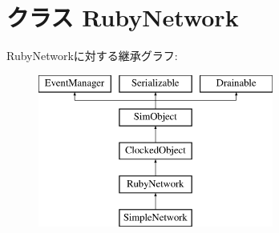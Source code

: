 \hypertarget{classNetwork_1_1RubyNetwork}{
\section{クラス RubyNetwork}
\label{classNetwork_1_1RubyNetwork}
}
RubyNetworkに対する継承グラフ:\begin{figure}[H]
\begin{center}
\leavevmode
\includegraphics[height=5cm]{classNetwork_1_1RubyNetwork}
\end{center}
\end{figure}
